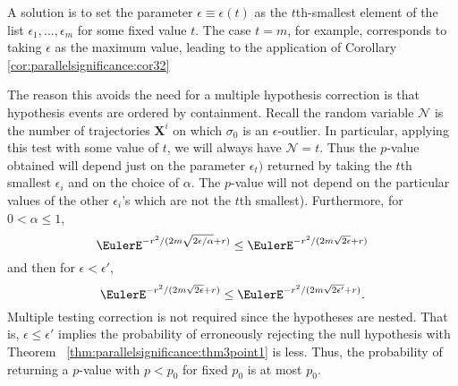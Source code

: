 \documentclass[12pt]{article}
\begin{document}
A solution is to set the parameter \( \epsilon \equiv \epsilon(t) \) as
the \( t \)th-smallest element of the list \( \epsilon_1, \dots,
\epsilon_m \) for some fixed value \( t \).  The case \( t = m \), for
example, corresponds to taking \( \epsilon \) as the maximum value,
leading to the application of Corollary~%
\ref{cor:parallelsignificance:cor32}

The reason this avoids the need for a multiple hypothesis correction is
that hypothesis events are ordered by containment.  Recall the random
variable \( \mathcal{N} \) is the number of trajectories \( \mathbf{X}^i
\) on which \( \sigma_0 \) is an \( \epsilon \)-outlier.  In particular,
applying this test with some value of \( t \), we will always have \(
\mathcal{N} = t \). Thus the \( p \)-value obtained will depend just on
the parameter \( \epsilon_t) \) returned by taking the \( t \)th
smallest \( \epsilon_i \) and on the choice of \( \alpha \).  The \( p \)-value
will not depend on the particular values of the other \( \epsilon_i \)'s
which are not the \( t \)th smallest).  Furthermore, for \( 0 < \alpha
\le 1 \),
\[
    \EulerE^{ -r^{2}/ (2 m\sqrt{2\epsilon/\alpha} + r)} \le \EulerE^{ -r^
    {2}/ (2 m\sqrt{2\epsilon} + r)}
\] and then for \( \epsilon < \epsilon' \),
\[
    \EulerE^{ -r^{2}/ (2 m\sqrt{2\epsilon} + r)} \le \EulerE^{ -r^{2}/ (2
    m\sqrt{2\epsilon'} + r)}.
\] %
Multiple testing correction is not required since the hypotheses are
nested.  That is, \( \epsilon \le \epsilon' \) implies the probability
of erroneously rejecting the null hypothesis with Theorem~%
\ref{thm:parallelsignificance:thm3point1} is less.  Thus, the
probability of returning a \( p \)-value with \( p < p_0 \) for fixed \(
p_0 \) is at most \( p_0 \).

\end{document}
